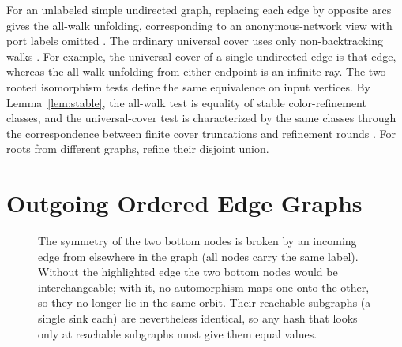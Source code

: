 \documentclass[twoside,leqno]{article}
\begin{document}
For an unlabeled simple undirected graph, replacing each edge by opposite arcs gives the all-walk unfolding, corresponding to an anonymous-network view with port labels omitted \cite{yamashita1996anonymous,krebs2015universal}. The ordinary universal cover uses only non-backtracking walks \cite{norris1995universal,krebs2015universal}. For example, the universal cover of a single undirected edge is that edge, whereas the all-walk unfolding from either endpoint is an infinite ray. The two rooted isomorphism tests define the same equivalence on input vertices. By Lemma~\ref{lem:stable}, the all-walk test is equality of stable color-refinement classes, and the universal-cover test is characterized by the same classes through the correspondence between finite cover truncations and refinement rounds \cite[Lemmas~2.6--2.7]{krebs2015universal}. For roots from different graphs, refine their disjoint union.

\section{Outgoing Ordered Edge Graphs}
\label{sec:outgoing-ordered-edge-graphs}

\begin{figure}[!b]
\centering
{}
\caption{The symmetry of the two bottom nodes is broken by an incoming edge from elsewhere in the graph (all nodes carry the same label). Without the highlighted edge the two bottom nodes would be interchangeable; with it, no automorphism maps one onto the other, so they no longer lie in the same orbit. Their reachable subgraphs (a single sink each) are nevertheless identical, so any hash that looks only at reachable subgraphs must give them equal values.}
\label{fig:breaksymmetry}
\end{figure}
\end{document}
